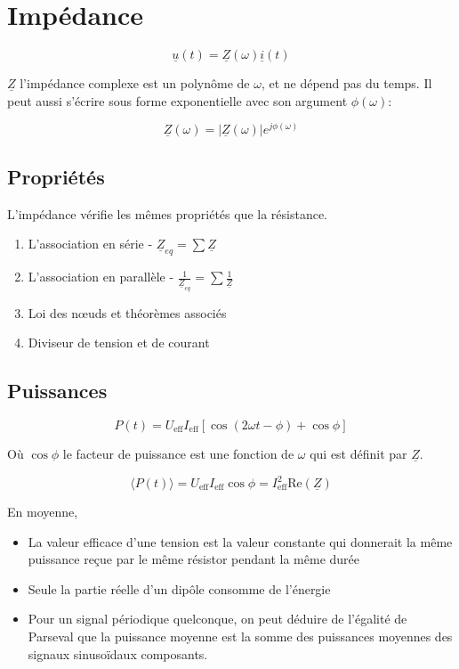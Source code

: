 \documentclass[openany]{book}
\begin{document}
\section{Impédance}
\[ \underline{u}(t) = \underline{Z}(\omega) \underline{i}(t) \]

\noindent $\underline{Z}$ l'impédance complexe est un polynôme de $\omega$, et ne dépend pas du temps. Il peut aussi s'écrire sous forme exponentielle avec son argument $ \phi(\omega) $:

\[ \underline{Z}(\omega) = |\underline{Z}(\omega)|e^{j\phi(\omega)} \]

\subsection{Propriétés}
L'impédance vérifie les mêmes propriétés que la résistance.
\begin{enumerate}
    \item L'association en série - $\underline{Z}_{eq}=\sum \underline{Z}$
    \item L'association en parallèle - $\frac{1}{\underline{Z}_{eq}}=\sum \frac{1}{\underline{Z}}$
    \item Loi des nœuds et théorèmes associés
    \item Diviseur de tension et de courant
\end{enumerate}

\subsection{Puissances}
\[ P(t) = U_{\text{eff}}I_{\text{eff}}[\cos{(2 \omega t - \phi) + \cos{\phi}}] \]

\noindent Où $\cos{\phi}$ le facteur de puissance est une fonction de $\omega$ qui est définit par $\underline{Z}$.

\[ \langle P(t) \rangle = U_{\text{eff}}I_{\text{eff}}\cos{\phi} = I_{\text{eff}}^2 \text{Re}(\underline{Z}) \]

\noindent En moyenne,
\begin{itemize}
    \item La valeur efficace d'une tension est la valeur constante qui donnerait la même puissance reçue par le même résistor pendant la même durée
    \item Seule la partie réelle d'un dipôle consomme de l'énergie
    \item Pour un signal périodique quelconque, on peut déduire de l'égalité de Parseval que la puissance moyenne est la somme des puissances moyennes des signaux sinusoïdaux composants.
\end{itemize}
\end{document}
